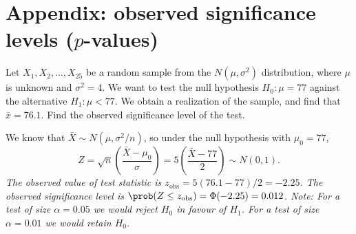 
\section*{Appendix: observed significance levels ($p$-values)}
\begin{example}
Let $X_1,X_2,\ldots,X_{25}$ be a random sample from the $ N(\mu,\sigma^2)$ distribution, where $\mu$ is unknown and $\sigma^2=4$. We want to test the null hypothesis $H_0:\mu=77$ against the alternative $H_1:\mu < 77$. We obtain a realization of the sample, and find that $\bar{x}=76.1$. Find the observed significance level of the test.

\begin{solution}
We know that $\bar{X}\sim N(\mu,\sigma^2/n)$, so under the null hypothesis with $\mu_0=77$,
\[
Z = \sqrt{n}\left(\frac{\bar{X}-\mu_{0}}{\sigma}\right) 
	= 5\left(\frac{\bar{X}-77}{2}\right) \sim N(0,1).
\]
\bit
\it The observed value of test statistic is $z_{\text{obs}} = 5(76.1-77)/2 = -2.25$.
\it The observed significance level is $\prob(Z\leq z_{\text{obs}}) = \Phi(-2.25) = 0.012$.
\eit
Note:
\bit
\it For a test of size $\alpha=0.05$ we would reject $H_0$ in favour of $H_1$.
\it For a test of size $\alpha=0.01$ we would retain $H_0$.
\eit
\end{solution}
\end{example}

\stopcontents[chapters]
\endinput
